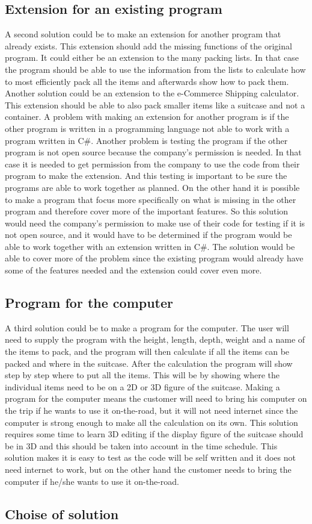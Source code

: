 \subsection{Extension for an existing program}
A second solution could be to make an extension for another program that already exists. This extension should add the missing functions of the original program. It could either be an extension to the many packing lists. In that case the program should be able to use the information from the lists to calculate how to most efficiently pack all the items and afterwards show how to pack them. Another solution could be an extension to the e-Commerce Shipping calculator. This extension should be able to also pack smaller items like a suitcase and not a container. A problem with making an extension for another program is if the other program is written in a programming language not able to work with a program written in C#. Another problem is testing the program if the other program is not open source because the company's permission is needed. In that case it is needed to get permission from the company to use the code from their program to make the extension. And this testing is important to be sure the programs are able to work together as planned. On the other hand it is possible to make a program that focus more specifically on what is missing in the other program and therefore cover more of the important features. So this solution would need the company’s permission to make use of their code for testing if it is not open source, and it would have to be determined if the program would be able to work together with an extension written in C#. The solution would be able to cover more of the problem since the existing program would already have some of the features needed and the extension could cover even more.
\newline
\subsection{Program for the computer}
A third solution could be to make a program for the computer. The user will need to supply the program with the height, length, depth, weight and a name of the items to pack, and the program will then calculate if all the items can be packed and where in the suitcase. After the calculation the program will show step by step where to put all the items. This will be by showing where the individual items need to be on a 2D or 3D figure of the suitcase. Making a program for the computer means the customer will need to bring his computer on the trip if he wants to use it on-the-road, but it will not need internet since the computer is strong enough to make all the calculation on its own. This solution requires some time to learn 3D editing if the display figure of the suitcase should be in 3D and this should be taken into account in the time schedule.  This solution makes it is easy to test as the code will be self written and it does not need internet to work, but on the other hand the customer needs to bring the computer if he/she wants to use it on-the-road.  
\newline
\subsection{Choise of solution}
